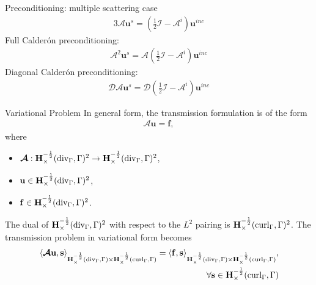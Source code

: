 \documentclass[12pt]{beamer}
\begin{document}
\begin{frame}{Preconditioning: multiple scattering case}
\begin{alignat}{3}
\bm{\mathcal{A}}\mathbf{ u}^s = \left(\frac{1}{2}\bm{\mathcal{ {I}}} - \bm{\mathcal{{A}}}^i \right) \mathbf{u}^{inc} \nonumber 
\end{alignat}
Full Calder\'on preconditioning:
\begin{align}
    \bm{\mathcal{A}}^2\mathbf{ u}^s = \bm{\mathcal{A}}\left(\frac{1}{2}\bm{\mathcal{ {I}}} - \bm{\mathcal{{A}}}^i \right) \mathbf{u}^{inc} \nonumber
\end{align}
\pause 
Diagonal Calder\'on preconditioning:
\begin{align}
    \bm{\mathcal{D}}\bm{\mathcal{A}}\mathbf{ u}^s = \bm{\mathcal{D}}\left(\frac{1}{2}\bm{\mathcal{ {I}}} - \bm{\mathcal{{A}}}^i \right) \mathbf{u}^{inc} \nonumber 
\end{align}
\end{frame}

\begin{frame}{Variational Problem}
    In general form, the transmission formulation is of the form
    \begin{align}
        \nonumber \bm{\mathcal{A}} \mathbf{u} = \mathbf{f},
    \end{align}
    where
    \begin{itemize}
        \item $\bm{\mathcal{A}} :\mathbf{H}^{-\frac{1}{2}}_\times (\textnormal{div}_\Gamma, \Gamma)^2 \rightarrow \mathbf{H}^{-\frac{1}{2}}_\times (\textnormal{div}_\Gamma, \Gamma)^2$,
        \item $\mathbf{u} \in \mathbf{H}^{-\frac{1}{2}}_\times (\textnormal{div}_\Gamma, \Gamma)^2$,
        \item $\mathbf{f} \in \mathbf{H}^{-\frac{1}{2}}_\times (\textnormal{div}_\Gamma, \Gamma)^2$.
    \end{itemize}
    The dual of $\mathbf{H}^{-\frac{1}{2}}_\times (\textnormal{div}_\Gamma, \Gamma)^2$ with respect to the $L^2$ pairing is $\mathbf{H}^{-\frac{1}{2}}_\times (\textnormal{curl}_\Gamma, \Gamma)^2$.
    The transmission problem in variational form becomes
    \begin{align}
        \langle \bm{\mathcal{A}} \mathbf{u}, \mathbf{s}\rangle_{\mathbf{H}^{-\frac{1}{2}}_\times (\textnormal{div}_\Gamma, \Gamma) \times \mathbf{H}^{-\frac{1}{2}}_\times (\textnormal{curl}_\Gamma, \Gamma)} = \langle  \mathbf{f}, \mathbf{s}\rangle_{\mathbf{H}^{-\frac{1}{2}}_\times (\textnormal{div}_\Gamma, \Gamma) \times \mathbf{H}^{-\frac{1}{2}}_\times (\textnormal{curl}_\Gamma, \Gamma)}, \nonumber \\
        \forall \mathbf{s} \in  \nonumber \mathbf{H}^{-\frac{1}{2}}_\times (\textnormal{curl}_\Gamma, \Gamma)
    \end{align}
\end{frame}
\end{document}
